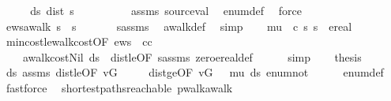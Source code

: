 \begin{isabellebody}
%
\isadelimproof
%
\endisadelimproof
%
\isatagproof
{}\isamarkupfalse%
\ {\isacharminus}\isanewline
\ \ \isamarkupfalse%
\ ds{\isacharcolon}\ {\isachardoublequoteopen}dist\ s\ {\isacharequal}\ \ {}{\isachardoublequoteclose}\ \isanewline
\ \ \ \ \isamarkupfalse%
\ assms\ source{\isacharunderscore}val\ \isamarkupfalse%
\ enum{\isacharunderscore}def\ \isamarkupfalse%
\ force\isanewline
\ \ \isamarkupfalse%
\ ews{\isacharcolon}{\isachardoublequoteopen}awalk\ s\ {\isacharbrackleft}{\isacharbrackright}\ s{\isachardoublequoteclose}\ \isanewline
\ \ \ \ \isamarkupfalse%
\ s{\isacharunderscore}assms{\isacharparenleft}{}{\isacharparenright}\ \isamarkupfalse%
\ awalk{\isacharunderscore}def\ \isamarkupfalse%
\ simp\isanewline
\ \ \isamarkupfalse%
\ mu{\isacharcolon}\ {\isachardoublequoteopen}{\isasymmu}\ c\ s\ s\ {\isacharequal}\ ereal\ {}{\isachardoublequoteclose}\ \isanewline
\ \ \ \ \isamarkupfalse%
\ min{\isacharunderscore}cost{\isacharunderscore}le{\isacharunderscore}walk{\isacharunderscore}cost{\isacharbrackleft}OF\ ews{\isacharcomma}\ \ c{\isacharequal}c{\isacharbrackright}\ \isanewline
\ \ \ \ awalk{\isacharunderscore}cost{\isacharunderscore}Nil\ ds\ \ dist{\isacharunderscore}le{\isacharunderscore}{\isasymmu}{\isacharbrackleft}OF\ s{\isacharunderscore}assms{\isacharparenleft}{}{\isacharparenright}{\isacharbrackright}\ zero{\isacharunderscore}ereal{\isacharunderscore}def\isanewline
\ \ \ \ \isamarkupfalse%
\ simp\isanewline
\ \ \isamarkupfalse%
\ {\isacharquery}thesis\ \isanewline
\ \ \ \ \isamarkupfalse%
\ ds\ assms\ dist{\isacharunderscore}le{\isacharunderscore}{\isasymmu}{\isacharbrackleft}OF\ vG{\isacharbrackright}\ \isanewline
\ \ \ \ dist{\isacharunderscore}ge{\isacharunderscore}{\isasymmu}{\isacharbrackleft}OF\ vG\ {\isacharunderscore}\ {\isacharunderscore}\ mu\ ds\ enum{\isacharunderscore}not{}{\isacharbrackright}\isanewline
\ \ \ \ \isamarkupfalse%
\ enum{\isacharunderscore}def\ \isamarkupfalse%
\ fastforce\isanewline
{}\isamarkupfalse%
%
\endisatagproof
{\isafoldproof}%
%
\isadelimproof
\isanewline
%
\endisadelimproof
\isanewline
{}\isamarkupfalse%
\ {\isacharparenleft}\ shortest{\isacharunderscore}paths{\isacharunderscore}reachable{\isacharparenright}\ pwalk{\isacharunderscore}awalk{\isacharcolon}\isanewline

\end{isabellebody}

